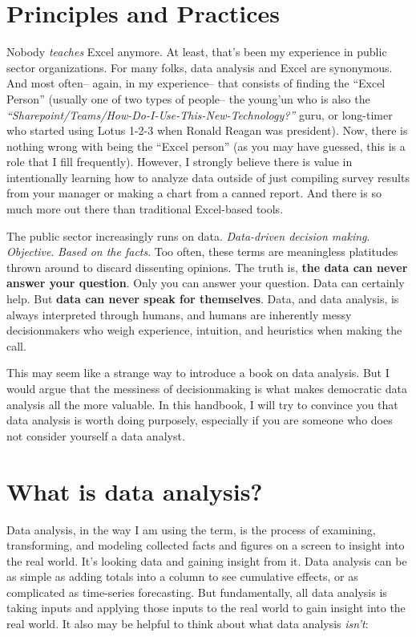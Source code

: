 \documentclass[
]{book}
\begin{document}
\hypertarget{principles-and-practices}{%
\section{Principles and Practices}\label{principles-and-practices}}

Nobody \emph{teaches} Excel anymore. At least, that's been my experience in public sector organizations. For many folks, data analysis and Excel are synonymous. And most often-- again, in my experience-- that consists of finding the ``Excel Person'' (usually one of two types of people-- the young'un who is also the \emph{``Sharepoint/Teams/How-Do-I-Use-This-New-Technology?''} guru, or long-timer who started using Lotus 1-2-3 when Ronald Reagan was president). Now, there is nothing wrong with being the ``Excel person'' (as you may have guessed, this is a role that I fill frequently). However, I strongly believe there is value in intentionally learning how to analyze data outside of just compiling survey results from your manager or making a chart from a canned report. And there is so much more out there than traditional Excel-based tools.

The public sector increasingly runs on data. \emph{Data-driven decision making}. \emph{Objective}. \emph{Based on the facts}. Too often, these terms are meaningless platitudes thrown around to discard dissenting opinions. The truth is, \textbf{the data can never answer your question}. Only you can answer your question. Data can certainly help. But \textbf{data can never speak for themselves}. Data, and data analysis, is always interpreted through humans, and humans are inherently messy decisionmakers who weigh experience, intuition, and heuristics when making the call.

This may seem like a strange way to introduce a book on data analysis. But I would argue that the messiness of decisionmaking is what makes democratic data analysis all the more valuable. In this handbook, I will try to convince you that data analysis is worth doing purposely, especially if you are someone who does not consider yourself a data analyst.

\hypertarget{what-is-data-analysis}{%
\section{What is data analysis?}\label{what-is-data-analysis}}

Data analysis, in the way I am using the term, is the process of examining, transforming, and modeling collected facts and figures on a screen to insight into the real world. It's looking data and gaining insight from it. Data analysis can be as simple as adding totals into a column to see cumulative effects, or as complicated as time-series forecasting. But fundamentally, all data analysis is taking inputs and applying those inputs to the real world to gain insight into the real world. It also may be helpful to think about what data analysis \emph{isn't}:
\end{document}
